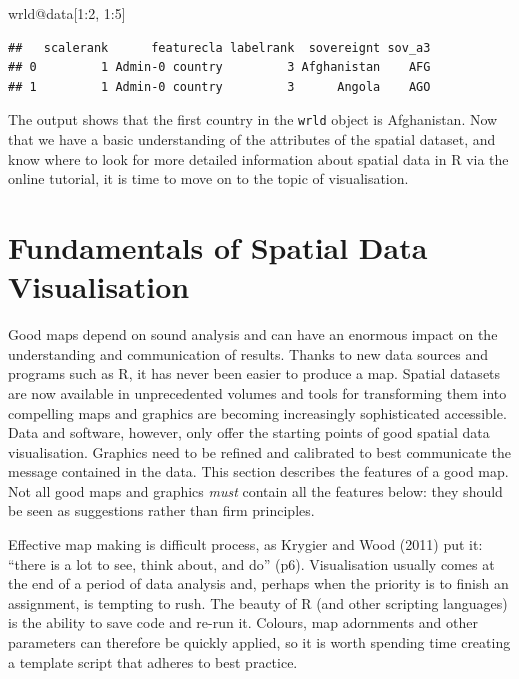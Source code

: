 \documentclass[]{article}
\newenvironment{Shaded}{}{}
\newcommand{\DecValTok}[1]{\textcolor[rgb]{0.25,0.63,0.44}{{#1}}}
\newcommand{\NormalTok}[1]{{#1}}
\begin{document}
\begin{Shaded}
\begin{Highlighting}[]
\NormalTok{wrld@data[}\DecValTok{1}\NormalTok{:}\DecValTok{2}\NormalTok{, }\DecValTok{1}\NormalTok{:}\DecValTok{5}\NormalTok{]}
\end{Highlighting}
\end{Shaded}

\begin{verbatim}
##   scalerank      featurecla labelrank  sovereignt sov_a3
## 0         1 Admin-0 country         3 Afghanistan    AFG
## 1         1 Admin-0 country         3      Angola    AGO
\end{verbatim}

The output shows that the first country in the \texttt{wrld} object is
Afghanistan. Now that we have a basic understanding of the attributes of
the spatial dataset, and know where to look for more detailed
information about spatial data in R via the online tutorial, it is time
to move on to the topic of visualisation.

\section{Fundamentals of Spatial Data
Visualisation}\label{fundamentals-of-spatial-data-visualisation}

Good maps depend on sound analysis and can have an enormous impact on
the understanding and communication of results. Thanks to new data
sources and programs such as R, it has never been easier to produce a
map. Spatial datasets are now available in unprecedented volumes and
tools for transforming them into compelling maps and graphics are
becoming increasingly sophisticated accessible. Data and software,
however, only offer the starting points of good spatial data
visualisation. Graphics need to be refined and calibrated to best
communicate the message contained in the data. This section describes
the features of a good map. Not all good maps and graphics \emph{must}
contain all the features below: they should be seen as suggestions
rather than firm principles.

Effective map making is difficult process, as Krygier and Wood (2011)
put it: ``there is a lot to see, think about, and do'' (p6).
Visualisation usually comes at the end of a period of data analysis and,
perhaps when the priority is to finish an assignment, is tempting to
rush. The beauty of R (and other scripting languages) is the ability to
save code and re-run it. Colours, map adornments and other parameters
can therefore be quickly applied, so it is worth spending time creating
a template script that adheres to best practice.
\end{document}
